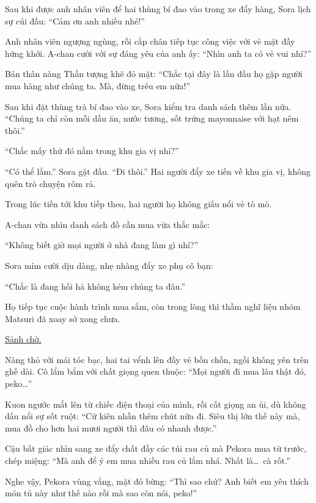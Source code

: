 \documentclass[../main.tex]{subfiles}
\begin{document}
Sau khi được anh nhân viên để hai thùng bí đao vào trong xe đẩy hàng, Sora lịch sự cúi đầu: ``Cảm ơn anh nhiều nhé!''

Anh nhân viên ngượng ngùng, rồi cắp chân tiếp tục công việc với vẻ mặt đầy hứng khởi. A-chan cười với sự đáng yêu của anh ấy: ``Nhìn anh ta có vẻ vui nhỉ?''

Bản thân nàng Thần tượng khẽ đỏ mặt: ``Chắc tại đây là lần đầu họ gặp người mua hàng như chúng ta. Mà, đừng trêu em nữa!''

Sau khi đặt thùng trà bí đao vào xe, Sora kiểm tra danh sách thêm lần nữa. ``Chúng ta chỉ còn mỗi dầu ăn, nước tương, sốt trứng mayonnaise với hạt nêm thôi.''

``Chắc mấy thứ đó nằm trong khu gia vị nhỉ?''

``Có thể lắm.'' Sora gật đầu. ``Đi thôi.'' Hai người đẩy xe tiến về khu gia vị, không quên trò chuyện rôm rả.

Trong lúc tiến tới khu tiếp theo, hai người họ không giấu nổi vẻ tò mò.

A-chan vừa nhìn danh sách đồ cần mua vừa thắc mắc:

``Không biết giờ mọi người ở nhà đang làm gì nhỉ?''

Sora mỉm cười dịu dàng, nhẹ nhàng đẩy xe phụ cô bạn:

``Chắc là đang hối hả không kém chúng ta đâu.''

Họ tiếp tục cuộc hành trình mua sắm, còn trong lòng thì thầm nghĩ liệu nhóm Matsuri đã xoay sở xong chưa.

\il

\begin{center}
    \uline{Sảnh chờ.}
\end{center}

Nàng thỏ với mái tóc bạc, hai tai vểnh lên đầy vẻ bồn chồn, ngồi không yên trên ghế dài. Cô lẩm bẩm với chất giọng quen thuộc: ``Mọi người đi mua lâu thật đó, peko\dots''

Kuon ngước mắt lên từ chiếc điện thoại của mình, rồi cất giọng an ủi, dù không dấu nổi sự sốt ruột: ``Cứ kiên nhẫn thêm chút nữa đi. Siêu thị lớn thế này mà, mua đồ cho hơn hai mươi người thì đâu có nhanh được.''

Cậu bất giác nhìn sang xe đẩy chất đầy các túi rau củ mà Pekora mua từ trước, chép miệng: ``Mà anh để ý em mua nhiều rau củ lắm nhá. Nhất là\dots\ cà rốt.''

Nghe vậy, Pekora vùng vằng, mặt đỏ bừng: ``Thì sao chứ? Anh biết em yêu thích món tủ này như thế nào rồi mà sao còn nói, peko!''
\end{document}
